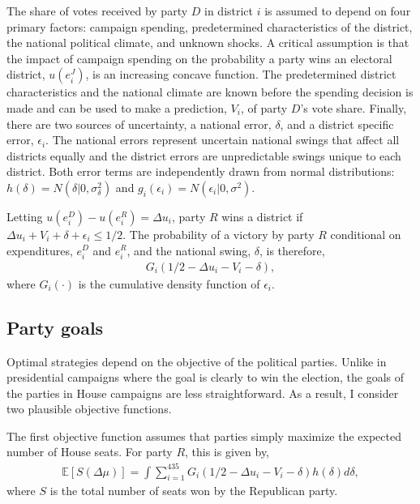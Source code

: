 \documentclass[12pt,final,fleqn]{article}
\theoremstyle{plain}
\newcommand\E{\mathbb{E}}
\begin{document}
The share of votes received by party $D$ in district $i$ is assumed to depend on four primary factors: campaign spending, predetermined characteristics of the district, the national political climate, and unknown shocks. A critical assumption is that the impact of campaign spending on the probability a party wins an electoral district, $u(e^J_i)$, is an increasing concave function. The predetermined district characteristics and the national climate are known before the spending decision is made and can be used to make a prediction, $V_i$, of party $D$'s vote share. Finally, there are two sources of uncertainty, a national error, $\delta$, and a district specific error, $\epsilon_i$. The national errors represent uncertain national swings that affect all districts equally and the district errors are unpredictable swings unique to each district. Both error terms are independently drawn from normal distributions: $h(\delta) = N(\delta|0, \sigma^2_\delta)$ and $g_i(\epsilon_i) = N(\epsilon_i|0, \sigma^2)$. 

Letting $u(e^D_i) - u(e^R_i) = \Delta u_i$, party $R$ wins a district if $\Delta u_i + V_i + \delta + \epsilon_i \leq 1/2$. The probability of a victory by party $R$ conditional on expenditures, $e^D_i$ and $e^R_i$, and the national swing, $\delta$, is therefore,
\begin{align}\label{eqn: Republican wins}
G_i(1/2 - \Delta u_i - V_i - \delta),
\end{align}
where $G_i(\cdot)$ is the cumulative density function of $\epsilon_i$. 

\subsection{Party goals}
Optimal strategies depend on the objective of the political parties. Unlike in presidential campaigns where the goal is clearly to win the election, the goals of the parties in House campaigns are less straightforward. As a result, I consider two plausible objective functions. 

The first objective function assumes that parties simply maximize the expected number of House seats. For party $R$, this is given by,
\begin{align} \label{eqn: expected number of seats}
\E\left[S (\Delta \mu)\right] = \int \sum_{i=1}^{435} G_i(1/2 - \Delta u_i - V_i - \delta)h(\delta) d\delta,
\end{align}
where $S$ is the total number of seats won by the Republican party. 
\end{document}
